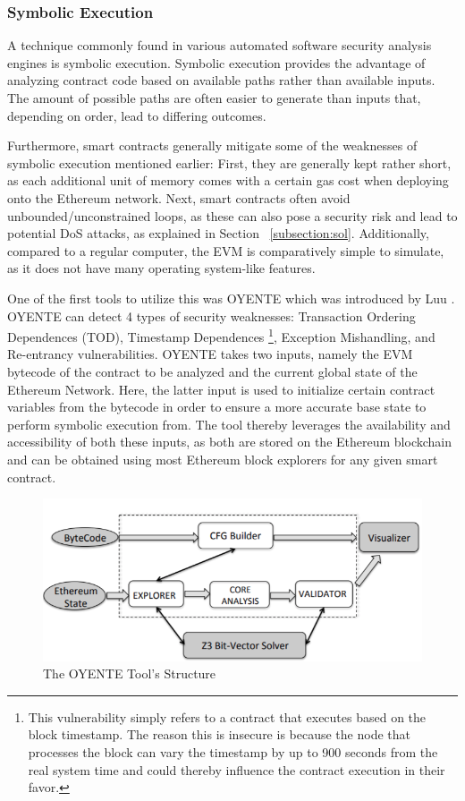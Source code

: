 \documentclass[letterpaper,twocolumn,10pt]{article}
\begin{document}
\subsubsection{Symbolic Execution}
A technique commonly found in various automated software security analysis engines is symbolic execution. Symbolic execution provides the advantage of analyzing contract code based on available paths rather than available inputs. The amount of possible paths are often easier to generate than inputs that, depending on order, lead to differing outcomes. 

Furthermore, smart contracts generally mitigate some of the weaknesses of symbolic execution mentioned earlier: First, they are generally kept rather short, as each additional unit of memory comes with a certain gas cost when deploying onto the Ethereum network. Next, smart contracts often avoid unbounded/unconstrained loops, as these can also pose a security risk and lead to potential DoS attacks, as explained in Section ~\ref{subsection:sol}. Additionally, compared to a regular computer, the EVM is comparatively simple to simulate, as it does not have many operating system-like features.


One of the first tools to utilize this was OYENTE which was introduced by Luu \cite{luu_chu_olickel_saxena_hobor_2016}. OYENTE can detect 4 types of security weaknesses: Transaction Ordering Dependences (TOD), Timestamp Dependences \footnote{This vulnerability simply refers to a contract that executes based on the block timestamp. The reason this is insecure is because the node that processes the block can vary the timestamp by up to 900 seconds from the real system time and could thereby influence the contract execution in their favor.}, Exception Mishandling, and Re-entrancy vulnerabilities. OYENTE takes two inputs, namely the EVM bytecode of the contract to be analyzed and the current global state of the Ethereum Network. Here, the latter input is used to initialize certain contract variables from the bytecode in order to ensure a more accurate base state to perform symbolic execution from. The tool thereby leverages the availability and accessibility of both these inputs, as both are stored on the Ethereum blockchain and can be obtained using most Ethereum block explorers for any given smart contract.

\begin{figure}
\begin{center}
\includegraphics[scale=0.35]{oyente}
\end{center}
\caption{\label{fig:oyente} The OYENTE Tool's Structure \cite{luu_chu_olickel_saxena_hobor_2016}}
\end{figure}
\end{document}
